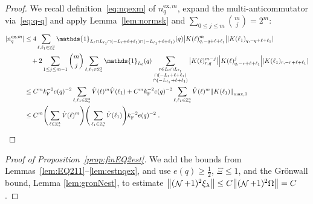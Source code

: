 \documentclass[12pt,a4paper]{article}
\numberwithin{equation}{section}
\newcommand{\1}{\mathbb{I}}
\newcommand{\ex}{\mathrm{ex}}
\newcommand{\F}{\mathrm{F}}
\DeclareMathOperator{\Z}{\mathbb{Z}}
\DeclareMathOperator{\NN}{\mathcal{N}}
\newcommand{\half}{\frac{1}{2}}
\theoremstyle{plain}
\theoremstyle{definition}
\theoremstyle{remark}
\theoremstyle{plain}
\theoremstyle{definition}
\theoremstyle{remark}
\begin{document}
\begin{proof}
We recall definition~\eqref{eq:nqexm} of $ n_q^{\ex,m} $, expand the multi-anticommutator via~\eqref{eq:q-q} and apply Lemma~\ref{lem:normsk} and $ \sum_{0 \le j \le m} {{m}\choose j} = 2^m $:
\begin{equation}
\begin{aligned}
	|n_q^{\ex,m}|
	&\leq 4 \sum_{\ell,\ell_1 \in \Z^3_*}
		\mathds{1}_{L_\ell \cap L_{\ell_1} \cap (-L_\ell + \ell + \ell_1) \cap (-L_{\ell_1} + \ell + \ell_1)}(q)
		\abs{K(\ell)^m_{q,-q+\ell+\ell_1}}
		\abs{K(\ell_1)_{q,-q+\ell+\ell_1}} \\
		&\quad + 2 \sum_{1 \le j \le m-1} {{m}\choose j} \sum_{\ell,\ell_1 \in \Z^3_*}
		\mathds{1}_{L_\ell}(q)
		\sum_{\substack{r\in L_{\ell} \cap L_{\ell_1}\\ \cap (-L_{\ell}+\ell+\ell_1) \\ \cap (-L_{\ell_1}+\ell+\ell_1 )}}
		\abs{K(\ell)^{m-j}_{r,q}}
		\abs{K(\ell)^j_{q,-r+\ell+\ell_1}}
		\abs{K(\ell_1)_{r,-r+\ell+\ell_1}} \\
	&\leq C^m k_{\F}^{-2} e(q)^{-2} \sum_{\ell,\ell_1 \in \Z^3_*}
		\hat{V}(\ell)^m
		\hat{V}(\ell_1)
	+ C^m k_{\F}^{-2} e(q)^{-2} \sum_{\ell,\ell_1 \in \Z^3_*}
		\hat{V}(\ell)^m
		\norm{K(\ell_1)}_{\max,1} \\
	&\leq C^m
		\Bigg( \sum\limits_{\ell \in \Z^3_*} \hat{V}(\ell)^m \Bigg)
		\Bigg( \sum\limits_{\ell_1 \in \Z^3_*} \hat{V}(\ell_1) \Bigg)
		k_{\F}^{-2} e(q)^{-2} \;.
\end{aligned}
\end{equation}

\end{proof}



\begin{proof}[Proof of Proposition~\ref{prop:finEQ2est}]
We add the bounds from Lemmas~\ref{lem:EQ211}--\ref{lem:estnqex}, and use $ e(q) \ge \half $, $ \Xi \le 1 $, and the Gr\"onwall bound, Lemma \ref{lem:gronNest}, to estimate $ \norm{(\NN+1)^2 \xi_\lambda} \le C \norm{(\NN+1)^2 \Omega} = C $.
\end{proof}
\end{document}
